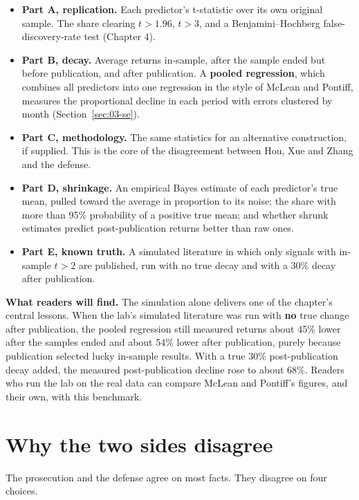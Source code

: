 \begin{itemize}
  \item \textbf{Part A, replication.} Each predictor's t-statistic over its own original sample. The share clearing $t > 1.96$, $t > 3$, and a Benjamini--Hochberg false-discovery-rate test (Chapter 4).
  \item \textbf{Part B, decay.} Average returns in-sample, after the sample ended but before publication, and after publication. A \textbf{pooled regression}, which combines all predictors into one regression in the style of McLean and Pontiff, measures the proportional decline in each period with errors clustered by month (Section~\ref{sec:03-se}).
  \item \textbf{Part C, methodology.} The same statistics for an alternative construction, if supplied. This is the core of the disagreement between Hou, Xue and Zhang and the defense.
  \item \textbf{Part D, shrinkage.} An empirical Bayes estimate of each predictor's true mean, pulled toward the average in proportion to its noise; the share with more than 95\% probability of a positive true mean; and whether shrunk estimates predict post-publication returns better than raw ones.
  \item \textbf{Part E, known truth.} A simulated literature in which only signals with in-sample $t > 2$ are published, run with no true decay and with a 30\% decay after publication.
\end{itemize}

\textbf{What readers will find.} The simulation alone delivers one of the chapter's central lessons. When the lab's simulated literature was run with \textbf{no} true change after publication, the pooled regression still measured returns about 45\% lower after the samples ended and about 54\% lower after publication, purely because publication selected lucky in-sample results. With a true 30\% post-publication decay added, the measured post-publication decline rose to about 68\%. Readers who run the lab on the real data can compare McLean and Pontiff's figures, and their own, with this benchmark.

\section{Why the two sides disagree}
\label{sec:10-why}

The prosecution and the defense agree on most facts. They disagree on four choices.

